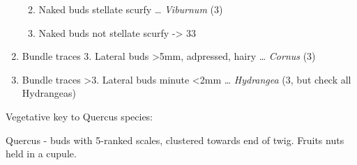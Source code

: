 \documentclass[openany]{book}
\providecommand{\tightlist}{%
  \setlength{\itemsep}{0pt}\setlength{\parskip}{0pt}}
\begin{document}
\begin{enumerate}
  \begin{enumerate}
  \def\labelenumii{\arabic{enumii}.}
  \setcounter{enumii}{30}
  \tightlist
  \item
    Naked buds stellate scurfy \ldots{} \emph{Viburnum} (3)
  \item
    Naked buds not stellate scurfy -\textgreater{} 33
  \end{enumerate}
\item
  Bundle traces 3. Lateral buds \textgreater{}5mm, adpressed, hairy
  \ldots{} \emph{Cornus} (3)
\item
  Bundle traces \textgreater{}3. Lateral buds minute \textless{}2mm
  \ldots{} \emph{Hydrangea} (3, but check all Hydrangeas)
\end{enumerate}

Vegetative key to Quercus species:

Quercus - buds with 5-ranked scales, clustered towards end of twig.
Fruits nuts held in a cupule.
\end{document}
